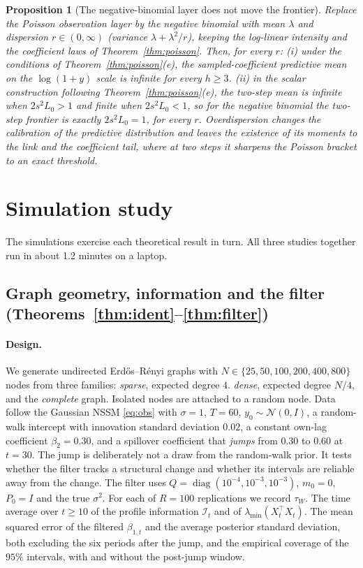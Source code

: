 \documentclass[12pt]{article}
\theoremstyle{plain}
\newtheorem{proposition}{Proposition}
\theoremstyle{definition}
\theoremstyle{remark}
\newcommand{\diag}{\operatorname{diag}}
\newcommand{\calI}{\mathcal{I}}
\newcommand{\calN}{\mathcal{N}}
\newcommand{\tauW}{\tau_W}
\newcommand{\T}{^{\top}}
\newcommand{\RuntimeSim}{1.2}
\begin{document}
\begin{proposition}[The negative-binomial layer does not move the frontier]\label{prop:nb}
Replace the Poisson observation layer by the negative binomial with mean $\lambda$ and dispersion $r\in(0,\infty)$ \textup{(}variance $\lambda+\lambda^2/r$\textup{)}, keeping the log-linear intensity and the coefficient laws of Theorem~\ref{thm:poisson}. Then, for every $r$: \textup{(i)} under the conditions of Theorem~\ref{thm:poisson}(e), the sampled-coefficient predictive mean on the $\log(1+y)$ scale is infinite for every $h\ge3$. \textup{(ii)} in the scalar construction following Theorem~\ref{thm:poisson}(e), the two-step mean is infinite when $2s^2L_0>1$ and finite when $2s^2L_0<1$, so for the negative binomial the two-step frontier is exactly $2s^2L_0=1$, for every $r$. Overdispersion changes the calibration of the predictive distribution and leaves the existence of its moments to the link and the coefficient tail, where at two steps it sharpens the Poisson bracket to an exact threshold.
\end{proposition}

\section{Simulation study}\label{sec:sim}

The simulations exercise each theoretical result in turn. All three studies together run in about \RuntimeSim{} minutes on a laptop.

\subsection{Graph geometry, information and the filter (Theorems~\ref{thm:ident}--\ref{thm:filter})}\label{sec:s1}

\paragraph{Design.} We generate undirected Erd\H{o}s--R\'enyi graphs with $N\in\{25,50,100,200,400,800\}$ nodes from three families: \emph{sparse}, expected degree $4$. \emph{dense}, expected degree $N/4$, and the \emph{complete} graph. Isolated nodes are attached to a random node. Data follow the Gaussian NSSM \eqref{eq:obs} with $\sigma=1$, $T=60$, $y_0\sim\calN(0,I)$, a random-walk intercept with innovation standard deviation $0.02$, a constant own-lag coefficient $\beta_2=0.30$, and a spillover coefficient that \emph{jumps} from $0.30$ to $0.60$ at $t=30$. The jump is deliberately not a draw from the random-walk prior. It tests whether the filter tracks a structural change and whether its intervals are reliable away from the change. The filter uses $Q=\diag(10^{-4},10^{-3},10^{-3})$, $m_0=0$, $P_0=I$ and the true $\sigma^2$. For each of $R=100$ replications we record $\tauW$. The time average over $t\ge 10$ of the profile information $\calI_t$ and of $\lambda_{\min}(X_t\T X_t)$. The mean squared error of the filtered $\beta_{1,t}$ and the average posterior standard deviation, both excluding the six periods after the jump, and the empirical coverage of the $95\%$ intervals, with and without the post-jump window.
\end{document}
